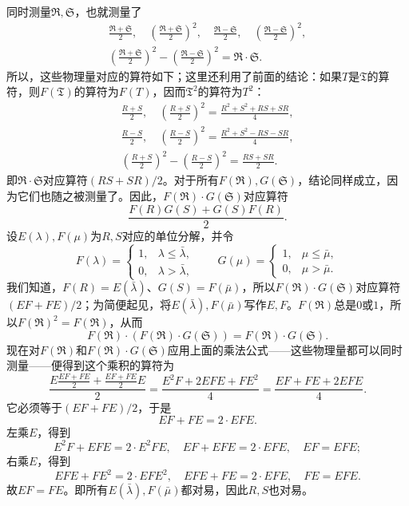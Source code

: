 \documentclass[fontsize=13pt,twoside,openany,headings=normal,parskip=false,bookmarkpackage=false,DIV=calc]{scrbook}
\begin{document}
\hypertarget{origpage-119}{}\label{origpage-119}同时测量$\mathfrak R,\allowbreak \mathfrak S$，也就测量了
\begin{gather*}
\frac{\mathfrak R+\mathfrak S}2,\quad
\left(\frac{\mathfrak R+\mathfrak S}2\right)^2,\quad
\frac{\mathfrak R-\mathfrak S}2,\quad
\left(\frac{\mathfrak R-\mathfrak S}2\right)^2,\\
\left(\frac{\mathfrak R+\mathfrak S}2\right)^2-
\left(\frac{\mathfrak R-\mathfrak S}2\right)^2=\mathfrak R\cdot\mathfrak S.
\end{gather*}
所以，这些物理量对应的算符如下；这里还利用了前面的结论：如果$T$是$\mathfrak T$的算符，则$F(\mathfrak T)$的算符为$F(T)$，因而$\mathfrak T^2$的算符为$T^2$：
\begin{gather*}
\frac{R+S}2,\quad
\left(\frac{R+S}2\right)^2=\frac{R^2+S^2+RS+SR}4,\\
\frac{R-S}2,\quad
\left(\frac{R-S}2\right)^2=\frac{R^2+S^2-RS-SR}4,\\
\left(\frac{R+S}2\right)^2-\left(\frac{R-S}2\right)^2=\frac{RS+SR}2.
\end{gather*}
即$\mathfrak R\cdot\mathfrak S$对应算符$(RS+SR)/2$。对于所有$F(\mathfrak R),\allowbreak G(\mathfrak S)$，结论同样成立，因为它们也随之被测量了。因此，$F(\mathfrak R)\cdot G(\mathfrak S)$对应算符
\[
\frac{F(R)G(S)+G(S)F(R)}2.
\]
设$E(\lambda),\allowbreak F(\mu)$为$R,\allowbreak S$对应的单位分解，并令
\[
F(\lambda)=\begin{cases}1,&\lambda\le\bar\lambda,\\0,&\lambda>\bar\lambda,\end{cases}
\qquad
G(\mu)=\begin{cases}1,&\mu\le\bar\mu,\\0,&\mu>\bar\mu.\end{cases}
\]
我们知道，$F(R)=E(\bar\lambda)$、$G(S)=F(\bar\mu)$，所以$F(\mathfrak R)\cdot G(\mathfrak S)$对应算符$(EF+FE)/2$；为简便起见，将$E(\bar\lambda),\allowbreak F(\bar\mu)$写作$E,\allowbreak F$。$F(\mathfrak R)$总是$0$或$1$，所以$F(\mathfrak R)^2=F(\mathfrak R)$，从而
\[
F(\mathfrak R)\cdot(F(\mathfrak R)\cdot G(\mathfrak S))=F(\mathfrak R)\cdot G(\mathfrak S).
\]
现在对$F(\mathfrak R)$和$F(\mathfrak R)\cdot G(\mathfrak S)$应用上面的乘法公式——这些物理量都可以同时测量——便得到这个乘积的算符为
\[
\frac{E\frac{EF+FE}2+\frac{EF+FE}2E}2
=\frac{E^2F+2EFE+FE^2}4
=\frac{EF+FE+2EFE}4.
\]
它必须等于$(EF+FE)/2$，于是
\[
EF+FE=2\cdot EFE.
\]
左乘$E$，得到
\[
E^2F+EFE=2\cdot E^2FE,\quad EF+EFE=2\cdot EFE,\quad EF=EFE;
\]
右乘$E$，得到
\[
EFE+FE^2=2\cdot EFE^2,\quad EFE+FE=2\cdot EFE,\quad FE=EFE.
\]
故$EF=FE$。即所有$E(\bar\lambda),\allowbreak F(\bar\mu)$都对易，因此$R,\allowbreak S$也对易。
\end{document}
